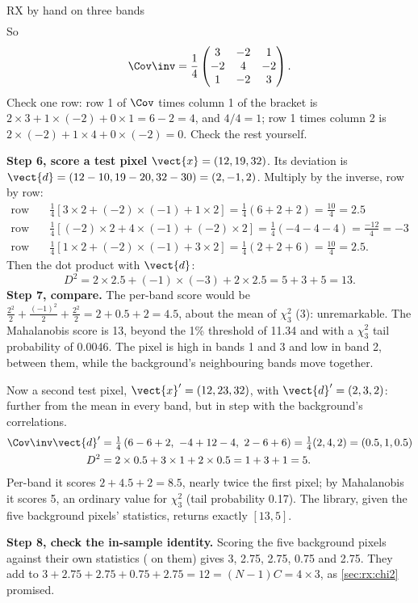 \begin{worked}[label={we:rx:three}]{RX by hand on three bands}
\begin{align*}
\end{align*}
So
\[
\Cov\inv = \frac14\begin{pmatrix} 3 & -2 & 1\\ -2 & 4 & -2\\ 1 & -2 & 3\end{pmatrix}.
\]
Check one row: row 1 of $\Cov$ times column 1 of the bracket is $2\times3 + 1\times(-2) + 0\times1 =
6 - 2 = 4$, and $4/4 = 1$; row 1 times column 2 is $2\times(-2) + 1\times4 + 0\times(-2) = 0$. Check
the rest yourself.

\textbf{Step 6, score a test pixel} $\vect{x} = (12, 19, 32)$. Its deviation is
$\vect{d} = (12 - 10, 19 - 20, 32 - 30) = (2, -1, 2)$. Multiply by the inverse, row by row:
\begin{align*}
\text{row 1:}&\quad \tfrac14\left[3\times2 + (-2)\times(-1) + 1\times2\right] = \tfrac14(6 + 2 + 2)
  = \tfrac{10}{4} = 2.5\\
\text{row 2:}&\quad \tfrac14\left[(-2)\times2 + 4\times(-1) + (-2)\times2\right] = \tfrac14(-4 - 4 - 4)
  = \tfrac{-12}{4} = -3\\
\text{row 3:}&\quad \tfrac14\left[1\times2 + (-2)\times(-1) + 3\times2\right] = \tfrac14(2 + 2 + 6)
  = \tfrac{10}{4} = 2.5 .
\end{align*}
Then the dot product with $\vect{d}$:
\[
D^2 = 2\times2.5 + (-1)\times(-3) + 2\times2.5 = 5 + 3 + 5 = 13 .
\]
\textbf{Step 7, compare.} The per-band score would be $\frac{2^2}{2} + \frac{(-1)^2}{2} +
\frac{2^2}{2} = 2 + 0.5 + 2 = 4.5$, about the mean of $\chi^2_3$ (3): unremarkable. The
Mahalanobis score is 13, beyond the 1\% threshold of 11.34 and with a $\chi^2_3$ tail probability of
0.0046. The pixel is high in bands 1 and 3 and low in band 2, between them, while the background's
neighbouring bands move together.

Now a second test pixel, $\vect{x}' = (12, 23, 32)$, with $\vect{d}' = (2, 3, 2)$: further from the
mean in every band, but in step with the background's correlations.
\begin{align*}
\Cov\inv\vect{d}' &= \tfrac14\left(6 - 6 + 2,\ -4 + 12 - 4,\ 2 - 6 + 6\right) = \tfrac14(2, 4, 2)
  = (0.5, 1, 0.5)\\
D^2 &= 2\times0.5 + 3\times1 + 2\times0.5 = 1 + 3 + 1 = 5 .
\end{align*}
Per-band it scores $2 + 4.5 + 2 = 8.5$, nearly twice the first pixel; by Mahalanobis it scores 5, an
ordinary value for $\chi^2_3$ (tail probability 0.17). The  library, given the five
background pixels' statistics, returns exactly $[13, 5]$\tagC.

\textbf{Step 8, check the in-sample identity.} Scoring the five background pixels against their own
statistics ( on them) gives 3, 2.75, 2.75, 0.75 and 2.75\tagC. They add to
$3 + 2.75 + 2.75 + 0.75 + 2.75 = 12 = (N - 1)C = 4\times3$, as \cref{sec:rx:chi2} promised.
\end{worked}

